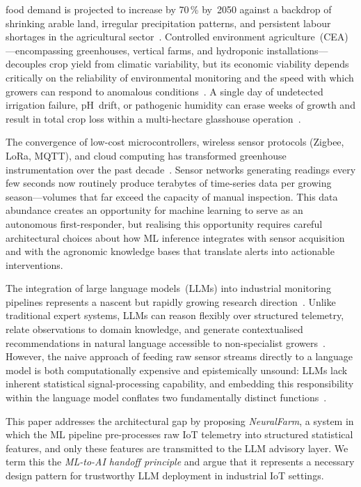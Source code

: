 \documentclass[journal,10pt,twocolumn]{IEEEtran}
\begin{document}
 food demand is projected to increase by 70\,\%
by~2050 against a backdrop of shrinking arable land, irregular
precipitation patterns, and persistent labour shortages in the
agricultural sector~\cite{FAO2017}.
Controlled environment agriculture~(CEA)---encompassing greenhouses,
vertical farms, and hydroponic installations---decouples crop yield from
climatic variability, but its economic viability depends critically on the
reliability of environmental monitoring and the speed with which growers
can respond to anomalous conditions~\cite{Graamans2018}.
A single day of undetected irrigation failure, pH~drift, or pathogenic
humidity can erase weeks of growth and result in total crop loss within
a multi-hectare glasshouse operation~\cite{Gomez2019}.

The convergence of low-cost microcontrollers, wireless sensor protocols
(Zigbee, LoRa, MQTT), and cloud computing has transformed greenhouse
instrumentation over the past decade~\cite{Verdouw2019}.
Sensor networks generating readings every few seconds now routinely
produce terabytes of time-series data per growing season---volumes that
far exceed the capacity of manual inspection.
This data abundance creates an opportunity for machine learning to serve
as an autonomous first-responder, but realising this opportunity requires
careful architectural choices about how ML inference integrates with
sensor acquisition and with the agronomic knowledge bases that translate
alerts into actionable interventions.

The integration of large language models~(LLMs) into industrial monitoring
pipelines represents a nascent but rapidly growing research
direction~\cite{Zhao2023,Yang2024}.
Unlike traditional expert systems, LLMs can reason flexibly over structured
telemetry, relate observations to domain knowledge, and generate
contextualised recommendations in natural language accessible to
non-specialist growers~\cite{Tzachor2023}.
However, the naive approach of feeding raw sensor streams directly to a
language model is both computationally expensive and epistemically unsound:
LLMs lack inherent statistical signal-processing capability, and embedding
this responsibility within the language model conflates two fundamentally
distinct functions~\cite{Bender2021}.

This paper addresses the architectural gap by proposing \textit{NeuralFarm},
a system in which the ML pipeline pre-processes raw IoT telemetry into
structured statistical features, and only these features are transmitted to
the LLM advisory layer.
We term this the \emph{ML-to-AI handoff principle} and argue that it
represents a necessary design pattern for trustworthy LLM deployment in
industrial IoT settings.
\end{document}
